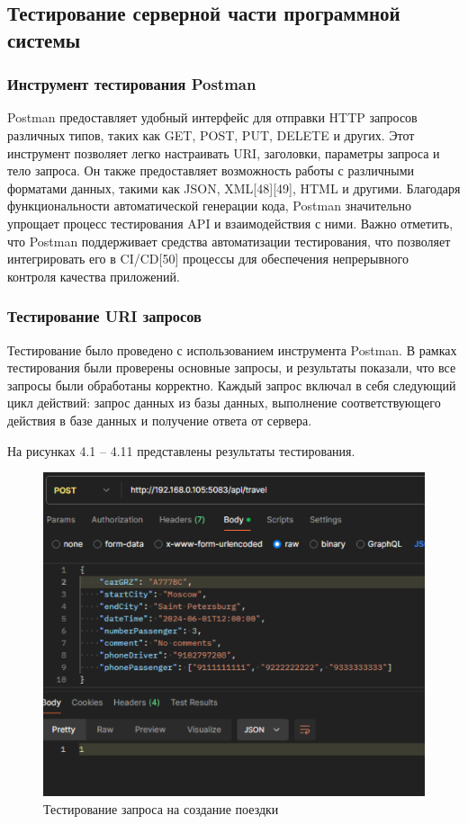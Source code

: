 \subsection{Тестирование серверной части программной системы}

\subsubsection{Инструмент тестирования Postman}

Postman предоставляет удобный интерфейс для отправки HTTP запросов различных типов, таких как GET, POST, PUT, DELETE и других. Этот инструмент позволяет легко настраивать URI, заголовки, параметры запроса и тело запроса. Он также предоставляет возможность работы с различными форматами данных, такими как JSON, XML[{48}][{49}], HTML и другими. Благодаря функциональности автоматической генерации кода, Postman значительно упрощает процесс тестирования API и взаимодействия с ними. Важно отметить, что Postman поддерживает средства автоматизации тестирования, что позволяет интегрировать его в CI/CD[{50}] процессы для обеспечения непрерывного контроля качества приложений.

\subsubsection{Тестирование URI запросов}

Тестирование было проведено с использованием инструмента Postman. В рамках тестирования были проверены основные запросы, и результаты показали, что все запросы были обработаны корректно. Каждый запрос включал в себя следующий цикл действий: запрос данных из базы данных, выполнение соответствующего действия в базе данных и получение ответа от сервера.

На рисунках 4.1 -- 4.11 представлены результаты тестирования.

\begin{figure}[H]
	\centering
	\includegraphics[width=0.7\linewidth]{images/test5}
	\caption{Тестирование запроса на создание поездки}
	\label{fig:test5}
\end{figure}

